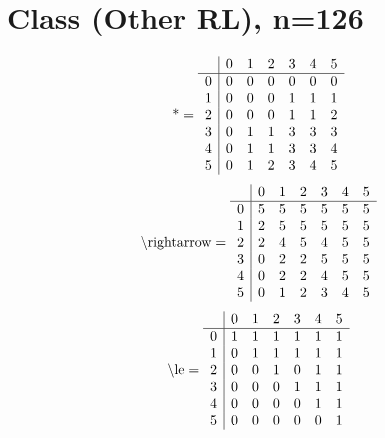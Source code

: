 \documentclass[11pt]{article}
\begin{document}
\section{Class (Other RL), n=126}
\[\text{*} = 
\begin{array}{r | r r r r r r}
 & 0 & 1 & 2 & 3 & 4 & 5 \\ \hline
0 & 0 & 0 & 0 & 0 & 0 & 0 \\
1 & 0 & 0 & 0 & 1 & 1 & 1 \\
2 & 0 & 0 & 0 & 1 & 1 & 2 \\
3 & 0 & 1 & 1 & 3 & 3 & 3 \\
4 & 0 & 1 & 1 & 3 & 3 & 4 \\
5 & 0 & 1 & 2 & 3 & 4 & 5 \\
\end{array}
\]
\[\text{\textbackslash rightarrow} = 
\begin{array}{r | r r r r r r}
 & 0 & 1 & 2 & 3 & 4 & 5 \\ \hline
0 & 5 & 5 & 5 & 5 & 5 & 5 \\
1 & 2 & 5 & 5 & 5 & 5 & 5 \\
2 & 2 & 4 & 5 & 4 & 5 & 5 \\
3 & 0 & 2 & 2 & 5 & 5 & 5 \\
4 & 0 & 2 & 2 & 4 & 5 & 5 \\
5 & 0 & 1 & 2 & 3 & 4 & 5 \\
\end{array}
\]
\[\text{\textbackslash le} = 
\begin{array}{r | r r r r r r}
 & 0 & 1 & 2 & 3 & 4 & 5 \\ \hline
0 & 1 & 1 & 1 & 1 & 1 & 1 \\
1 & 0 & 1 & 1 & 1 & 1 & 1 \\
2 & 0 & 0 & 1 & 0 & 1 & 1 \\
3 & 0 & 0 & 0 & 1 & 1 & 1 \\
4 & 0 & 0 & 0 & 0 & 1 & 1 \\
5 & 0 & 0 & 0 & 0 & 0 & 1 \\
\end{array}
\]
\end{document}
